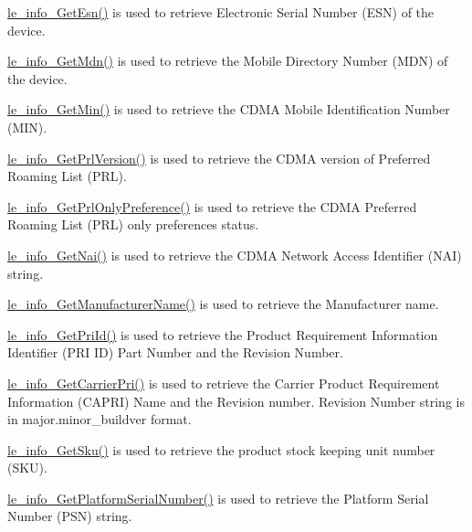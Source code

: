 \hyperlink{le__info__interface_8h_abbbe2b953dce20ce396539026981fe2c}{le\+\_\+info\+\_\+\+Get\+Esn()} is used to retrieve Electronic Serial Number (E\+SN) of the device.

\hyperlink{le__info__interface_8h_afa231bb29b3dde844dfe6df40862eddb}{le\+\_\+info\+\_\+\+Get\+Mdn()} is used to retrieve the Mobile Directory Number (M\+DN) of the device.

\hyperlink{le__info__interface_8h_a0fcb57f7979c32961b1a026f438d936c}{le\+\_\+info\+\_\+\+Get\+Min()} is used to retrieve the C\+D\+MA Mobile Identification Number (M\+IN).

\hyperlink{le__info__interface_8h_ab12105ea6f654c3124ec812234e0f1fa}{le\+\_\+info\+\_\+\+Get\+Prl\+Version()} is used to retrieve the C\+D\+MA version of Preferred Roaming List (P\+RL).

\hyperlink{le__info__interface_8h_a3f2f3ea1720f9ff173483046966ebdb3}{le\+\_\+info\+\_\+\+Get\+Prl\+Only\+Preference()} is used to retrieve the C\+D\+MA Preferred Roaming List (P\+RL) only preferences status.

\hyperlink{le__info__interface_8h_ad01af666fff5fd43a2616e4391ae29e8}{le\+\_\+info\+\_\+\+Get\+Nai()} is used to retrieve the C\+D\+MA Network Access Identifier (N\+AI) string.

\hyperlink{le__info__interface_8h_a94b60d7b13674b4253bebaa52401747d}{le\+\_\+info\+\_\+\+Get\+Manufacturer\+Name()} is used to retrieve the Manufacturer name.

\hyperlink{le__info__interface_8h_ae2cc81573158df20f6196c43dc4b936d}{le\+\_\+info\+\_\+\+Get\+Pri\+Id()} is used to retrieve the Product Requirement Information Identifier (P\+RI ID) Part Number and the Revision Number.

\hyperlink{le__info__interface_8h_a943165dadc90bf9cef367b707eb9bcab}{le\+\_\+info\+\_\+\+Get\+Carrier\+Pri()} is used to retrieve the Carrier Product Requirement Information (C\+A\+P\+RI) Name and the Revision number. Revision Number string is in major.\+minor\+\_\+buildver format.

\hyperlink{le__info__interface_8h_a362c28ae862ed00b43a69a44a20dc782}{le\+\_\+info\+\_\+\+Get\+Sku()} is used to retrieve the product stock keeping unit number (S\+KU).

\hyperlink{le__info__interface_8h_ab61ead104b938d1b5ba038bcde7f1954}{le\+\_\+info\+\_\+\+Get\+Platform\+Serial\+Number()} is used to retrieve the Platform Serial Number (P\+SN) string.

